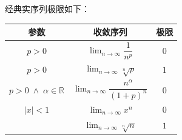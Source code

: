 \documentclass{tufte-book}
\begin{document}
\par 经典实序列极限如下：
\begin{table}
    \centering
    \begin{tabular}{ccc}
        \toprule
        参数                                 & 收敛序列                                                     & 极限  \\
        \midrule
        \(p>0\)                              & \(\displaystyle \lim_{n\to\infty}\dfrac{1}{n^p}\)            & \(0\) \\
        \midrule
        \(p>0\)                              & \(\displaystyle \lim_{n\to\infty}\sqrt[n]{p}\)               & \(1\) \\
        \midrule
        \(p>0\;\wedge\;\alpha\in\mathbb{R}\) & \(\displaystyle \lim_{n\to\infty}\dfrac{n^\alpha}{(1+p)^n}\) & \(0\) \\
        \midrule
        \(\vert x\vert<1\)                   & \(\displaystyle \lim_{n\to\infty}x^n\)                       & \(0\) \\
        \midrule
        \diagbox{}{}                         & \(\displaystyle \lim_{n\to\infty}\sqrt[n]{n}\)               & \(1\) \\
        \bottomrule
    \end{tabular}
\end{table}
\end{document}
